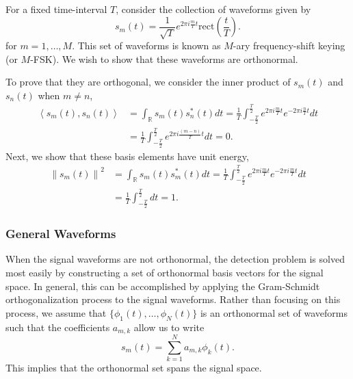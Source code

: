 \begin{example} \label{example:TSpacedTruncatedSinusoids}
For a fixed time-interval $T$, consider the collection of waveforms given by
\begin{equation*}
s_m(t) = \frac{1}{\sqrt{T}} e^{2 \pi i \frac{m}{T} t} \mathrm{rect} \left( \frac{t}{T} \right) .
\end{equation*}
for $m = 1, \ldots, M$.
This set of waveforms is known as $M$-ary frequency-shift keying (or $M$-FSK).
We wish to show that these waveforms are orthonormal.

To prove that they are orthogonal, we consider the inner product of $s_m(t)$ and $s_n(t)$ when $m \neq n$,
\begin{equation*}
\begin{split}
\left\langle s_m (t), s_n (t) \right\rangle
&= \int_{\mathbb{R}} s_m (t) s_n^* (t) dt 
= \frac{1}{T} \int_{-\frac{T}{2}}^{\frac{T}{2}}
e^{2 \pi i \frac{m}{T} t} e^{- 2 \pi i \frac{n}{T} t} dt \\
&= \frac{1}{T} \int_{-\frac{T}{2}}^{\frac{T}{2}}
e^{2 \pi i \frac{(m-n)}{T} t} dt
= 0 .
\end{split}
\end{equation*}
Next, we show that these basis elements have unit energy,
\begin{equation*}
\begin{split}
\left\| s_m(t) \right\|^2
&= \int_{\mathbb{R}} s_m (t) s_m^* (t) dt 
= \frac{1}{T} \int_{-\frac{T}{2}}^{\frac{T}{2}}
e^{2 \pi i \frac{m}{T} t} e^{- 2 \pi i \frac{m}{T} t} dt \\
&= \frac{1}{T} \int_{-\frac{T}{2}}^{\frac{T}{2}} dt
= 1 .
\end{split}
\end{equation*}
\end{example}

\subsubsection{General Waveforms}

When the signal waveforms are not orthonormal, the detection problem is solved most easily by constructing a set of orthonormal basis vectors for the signal space.
In general, this can be accomplished by applying the Gram-Schmidt orthogonalization process to the signal waveforms.
Rather than focusing on this process, we assume that $\{ \phi_1 (t), \ldots , \phi_N (t) \}$ is an orthonormal set of waveforms such that the coefficients $a_{m,k}$ allow us to write
\[ s_m (t) = \sum_{k=1}^N a_{m,k} \phi_k (t). \]
This implies that the orthonormal set spans the signal space.

